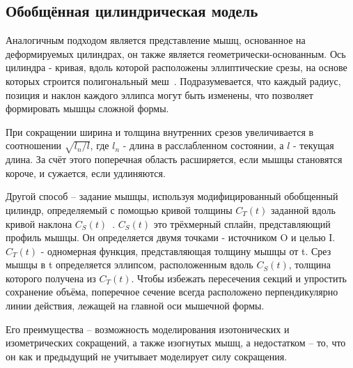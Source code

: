 \subsection{Обобщённая цилиндрическая модель}
\label{subsec:cylinder}
Аналогичным подходом является представление мышц, основанное на деформируемых цилиндрах, он также является геометрически-основанным. Ось цилиндра - кривая, вдоль которой расположены эллиптические срезы, на основе которых строится полигональный меш~\cite{Wilhelms97}. Подразумевается, что каждый радиус, позиция и наклон каждого эллипса могут быть изменены, что позволяет формировать мышцы сложной формы.
\par При сокращении ширина и толщина внутренних срезов увеличивается в соотношении $\sqrt{l_{n} / l}$, где $l_{n}$ - длина в расслабленном состоянии, а $l$ - текущая длина. За счёт этого поперечная область расширяется, если мышцы становятся короче, и сужается, если удлиняются.
\par Другой способ -- задание мышцы, используя модифицированный обобщенный цилиндр, определяемый с помощью кривой толщины $C_{T}(t)$ заданной вдоль кривой наклона $C_{S}(t)$~\cite{ramos}. $C_{S}(t)$ это трёхмерный сплайн, представляющий профиль мышцы. Он определяется двумя точками - источником O и целью I. $C_{T}(t)$ - одномерная функция, представляющая толщину мышцы от t. Срез мышцы в t определяется эллипсом, расположенным вдоль $C_{S}(t)$, толщина которого получена из $C_{T}(t)$. Чтобы избежать пересечения секций и упростить сохранение объёма, поперечное сечение всегда расположено перпендикулярно линии действия, лежащей на главной оси мышечной формы.
\par Его преимущества -- возможность моделирования изотонических и изометрических сокращений, а также изогнутых мышц, а недостатком -- то, что он как и предыдущий не учитывает моделирует силу сокращения.


